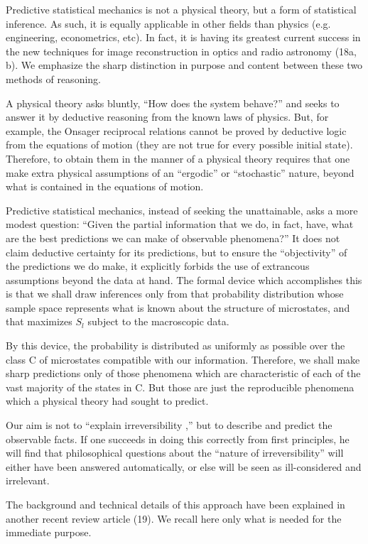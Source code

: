 \documentclass{article}
\begin{document}
Predictive statistical mechanics is not a physical theory, but a form of statistical inference. As such, it is equally applicable in other fields than physics (e.g. engineering, econometrics, etc). In fact, it is having its greatest current success in the new techniques for image reconstruction in optics and radio astronomy (18a, b). We emphasize the sharp distinction in purpose and content between these two methods of reasoning.

A physical theory asks bluntly, ``How does the system behave?'' and seeks to answer it by deductive reasoning from the known laws of physics. But, for example, the Onsager reciprocal relations cannot be proved by deductive logic from the equations of motion (they are not true for every possible initial state). Therefore, to obtain them in the manner of a physical theory requires that one make extra physical assumptions of an ``ergodic'' or ``stochastic'' nature, beyond what is contained in the equations of motion.

Predictive statistical mechanics, instead of seeking the unattainable, asks a more modest question: ``Given the partial information that we do, in fact, have, what are the best predictions we can make of observable phenomena?'' It does not claim deductive certainty for its predictions, but to ensure the ``objectivity'' of the predictions we do make, it explicitly forbids the use of extrancous assumptions beyond the data at hand. The formal device which accomplishes this is that we shall draw inferences only from that probability distribution whose sample space represents what is known about the structure of microstates, and that maximizes $S_l$ subject to the macroscopic data.

By this device, the probability is distributed as uniformly as possible over the class C of microstates compatible with our information. Therefore, we shall make sharp predictions only of those phenomena which are characteristic of each of the vast majority of the states in C. But those are just the reproducible phenomena which a physical theory had sought to predict.

Our aim is not to ``explain irreversibility ,'' but to describe and predict the observable facts. If one succeeds in doing this correctly from first principles, he will find that philosophical questions about the ``nature of irreversibility'' will either have been answered automatically, or else will be seen as ill-considered and irrelevant. 

The background and technical details of this approach have been explained in another recent review article (19). We recall here only what is needed for the immediate purpose.
\end{document}
